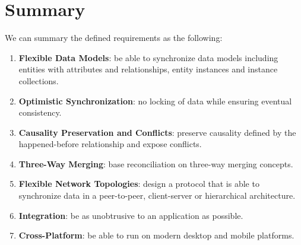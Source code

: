 \section{Summary}

We can summary the defined requirements as the following:

\begin{enumerate}
\item \textbf{Flexible Data Models}: be able to synchronize data models including entities with attributes and relationships, entity instances and instance collections.
\item \textbf{Optimistic Synchronization}: no locking of data while ensuring eventual consistency.
\item \textbf{Causality Preservation and Conflicts}: preserve causality defined by the happened-before relationship and expose conflicts.
\item \textbf{Three-Way Merging}: base reconciliation on three-way merging concepts.
\item \textbf{Flexible Network Topologies}: design a protocol that is able to synchronize data in a peer-to-peer, client-server or hierarchical architecture.
\item \textbf{Integration}: be as unobtrusive to an application as possible.
\item \textbf{Cross-Platform}: be able to run on modern desktop and mobile platforms.
\end{enumerate}
